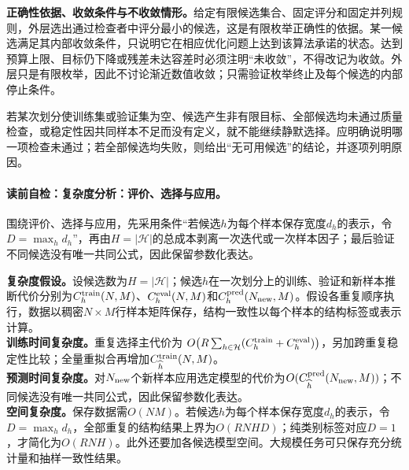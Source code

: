 \label{struct:V4-C01-CH25}
\textbf{正确性依据、收敛条件与不收敛情形。}给定有限候选集合、固定评分和固定并列规则，外层选出通过检查者中评分最小的候选，这是有限枚举正确性的依据。某一候选满足其内部收敛条件，只说明它在相应优化问题上达到该算法承诺的状态。达到预算上限、目标仍下降或残差未达容差时必须注明“未收敛”，不得改记为收敛。外层只是有限枚举，因此不讨论渐近数值收敛；只需验证枚举终止及每个候选的内部停止条件。

\begin{notapplicablebox}[title=\SLDegeneracyTitle]
若某次划分使训练集或验证集为空、候选产生非有限目标、全部候选均未通过质量检查，或稳定性因共同样本不足而没有定义，就不能继续静默选择。应明确说明哪一项检查未通过；若全部候选均失败，则给出“无可用候选”的结论，并逐项列明原因。
\end{notapplicablebox}

\label{struct:V4-C01-CH26}
\label{struct:V4-C01-CH27}
\paragraph{读前自检：复杂度分析：评价、选择与应用。}围绕评价、选择与应用，先采用条件“若候选$h$为每个样本保存宽度$d_h$的表示，令$D=\max_h d_h$”，再由$H=|\mathcal H|$的总成本剥离一次迭代或一次样本因子；最后验证不同候选没有唯一共同公式，因此保留参数化表达。\par

\begin{complexitybox}
\textbf{复杂度假设。}设候选数为$H=|\mathcal H|$；候选$h$在一次划分上的训练、验证和新样本推断代价分别为$C_h^{\rm train}(N,M)$、$C_h^{\rm eval}(N,M)$和$C_h^{\rm pred}(N_{\rm new},M)$。假设各重复顺序执行，数据以稠密$N\times M$行样本矩阵保存，结构一致性以每个样本的结构标签或表示计算。\\
\textbf{训练时间复杂度。}重复选择主代价为
$O\!\left(R\sum_{h\in\mathcal H}(C_h^{\rm train}+C_h^{\rm eval})\right)$，另加跨重复稳定性比较；全量重拟合再增加$C_{\widehat h}^{\rm train}(N,M)$。\\
\textbf{预测时间复杂度。}对$N_{\rm new}$个新样本应用选定模型的代价为$O(C_{\widehat h}^{\rm pred}(N_{\rm new},M))$；不同候选没有唯一共同公式，因此保留参数化表达。\\
\textbf{空间复杂度。}保存数据需$O(NM)$。若候选$h$为每个样本保存宽度$d_h$的表示，令$D=\max_h d_h$，全部重复的结构结果上界为$O(RNHD)$；纯类别标签对应$D=1$，才简化为$O(RNH)$。此外还要加各候选模型空间。大规模任务可只保存充分统计量和抽样一致性结果。
\end{complexitybox}

